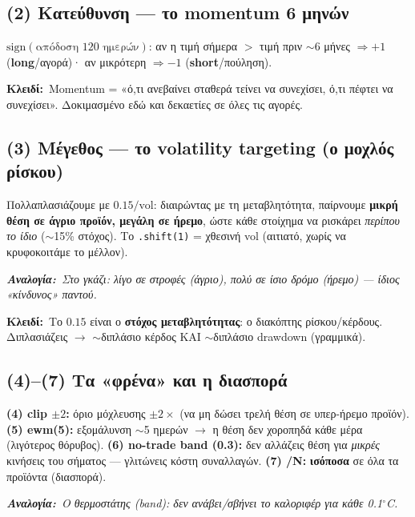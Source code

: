 \documentclass[11pt]{article}
\newcommand{\key}[1]{\par\medskip\noindent\colorbox{soft}{\parbox{\dimexpr\linewidth-2\fboxsep}{\textcolor{accent}{\textbf{Κλειδί:}}\ #1}}\par\medskip}
\newcommand{\analogy}[1]{\par\smallskip\noindent\textit{\textbf{Αναλογία:}\ #1}\par\smallskip}
\begin{document}
\subsection{(2) Κατεύθυνση --- το momentum 6 μηνών}
$\mathrm{sign}(\text{απόδοση 120 ημερών})$: αν η τιμή σήμερα $>$ τιμή πριν $\sim$6 μήνες $\Rightarrow +1$
(\textbf{long}/αγορά)· αν μικρότερη $\Rightarrow -1$ (\textbf{short}/πούληση).
\key{Momentum = «ό,τι ανεβαίνει σταθερά τείνει να συνεχίσει, ό,τι πέφτει να συνεχίσει». Δοκιμασμένο εδώ
και δεκαετίες σε όλες τις αγορές.}

\subsection{(3) Μέγεθος --- το volatility targeting (ο μοχλός ρίσκου)}
Πολλαπλασιάζουμε με $0.15/\text{vol}$: διαιρώντας με τη μεταβλητότητα, παίρνουμε \textbf{μικρή θέση σε
άγριο προϊόν, μεγάλη σε ήρεμο}, ώστε κάθε στοίχημα να ρισκάρει \emph{περίπου το ίδιο} ($\sim$15\% στόχος).
Το \texttt{.shift(1)} = χθεσινή vol (αιτιατό, χωρίς να κρυφοκοιτάμε το μέλλον).
\analogy{Στο γκάζι: λίγο σε στροφές (άγριο), πολύ σε ίσιο δρόμο (ήρεμο) --- ίδιος «κίνδυνος» παντού.}
\key{Το $0.15$ είναι ο \textbf{στόχος μεταβλητότητας}: ο διακόπτης ρίσκου/κέρδους. Διπλασιάζεις $\to$
$\sim$διπλάσιο κέρδος ΚΑΙ $\sim$διπλάσιο drawdown (γραμμικά).}

\subsection{(4)--(7) Τα «φρένα» και η διασπορά}
\textbf{(4) clip $\pm2$:} όριο μόχλευσης $\pm2\times$ (να μη δώσει τρελή θέση σε υπερ-ήρεμο προϊόν).
\textbf{(5) ewm(5):} εξομάλυνση $\sim$5 ημερών $\to$ η θέση δεν χοροπηδά κάθε μέρα (λιγότερος θόρυβος).
\textbf{(6) no-trade band (0.3):} δεν αλλάζεις θέση για \emph{μικρές} κινήσεις του σήματος --- γλιτώνεις
κόστη συναλλαγών. \textbf{(7) /N:} \textbf{ισόποσα} σε όλα τα προϊόντα (διασπορά).
\analogy{Ο θερμοστάτης (band): δεν ανάβει/σβήνει το καλοριφέρ για κάθε 0.1$^\circ$C.}
\end{document}
